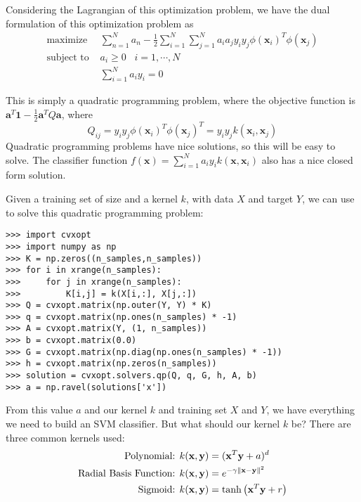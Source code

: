 Considering the Lagrangian of this optimization problem, we have the dual formulation of this optimization problem as
\begin{align*}
\text{maximize } & \sum_{n=1}^{N} a_{n} - \frac{1}{2} \sum_{i=1}^{N}\sum_{j=1}^{N} a_{i}a_{j}y_{i}y_{j}\phi(\mathbf{x}_{i})^{T}\phi(\mathbf{x}_{j}) \\
\text{subject to } & a_{i} \geq 0 \; \; \; i = 1, \cdots, N \\
 & \sum_{i=1}^{N} a_{i}y_{i} = 0
\end{align*}

This is simply a quadratic programming problem, where the objective function is 
$\mathbf{a}^{T}\mathbf{1} - \frac{1}{2} \mathbf{a}^{T}Q\mathbf{a}$, where 
\begin{equation*}
Q_{ij} = y_{i}y_{j}\phi(\mathbf{x}_{i})^{T}\phi(\mathbf{x}_{j})^{T} = y_{i}y_{j}k(\mathbf{x}_{i},\mathbf{x}_{j})
\end{equation*}
Quadratic programming problems have nice solutions, so this will be easy to solve. 
The classifier function $f(\mathbf{x}) = \sum_{i=1}^{N} a_{i}y_{i}k(\mathbf{x},\mathbf{x}_{i})$ 
also has a nice closed form solution.

Given a training set of size  and a kernel $k$, with data $X$ and target $Y$, 
we can use  to solve this quadratic programming problem:
\begin{lstlisting}
>>> import cvxopt
>>> import numpy as np
>>> K = np.zeros((n_samples,n_samples))
>>> for i in xrange(n_samples):
>>>     for j in xrange(n_samples):
>>>         K[i,j] = k(X[i,:], X[j,:])
>>> Q = cvxopt.matrix(np.outer(Y, Y) * K)
>>> q = cvxopt.matrix(np.ones(n_samples) * -1)
>>> A = cvxopt.matrix(Y, (1, n_samples))
>>> b = cvxopt.matrix(0.0)
>>> G = cvxopt.matrix(np.diag(np.ones(n_samples) * -1))
>>> h = cvxopt.matrix(np.zeros(n_samples))
>>> solution = cvxopt.solvers.qp(Q, q, G, h, A, b)
>>> a = np.ravel(solutions['x'])
\end{lstlisting}
From this value $a$ and our kernel $k$ and training set $X$ and $Y$, we have everything we need to build an SVM classifier. 
But what should our kernel $k$ be?
There are three common kernels used:
\begin{align*}
\text{Polynomial: } & k(\mathbf{x},\mathbf{y}) = (\mathbf{x}^{T}\mathbf{y} + a)^{d} \\
\text{Radial Basis Function: } & k(\mathbf{x},\mathbf{y}) = e^{-\gamma \left\lVert\mathbf{x} - \mathbf{y}\right\rVert^{2}} \\
\text{Sigmoid: } & k(\mathbf{x},\mathbf{y}) = \tanh \left(\mathbf{x}^{T}\mathbf{y} + r \right)
\end{align*}

